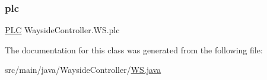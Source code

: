 \subsubsection{\texorpdfstring{plc}{plc}}
{\footnotesize\ttfamily \hyperlink{classWaysideController_1_1PLC}{P\+LC} Wayside\+Controller.\+W\+S.\+plc\hspace{0.3cm}{\ttfamily [private]}}



The documentation for this class was generated from the following file\+:\begin{DoxyCompactItemize}
\item 
src/main/java/\+Wayside\+Controller/\hyperlink{WS_8java}{W\+S.\+java}\end{DoxyCompactItemize}

